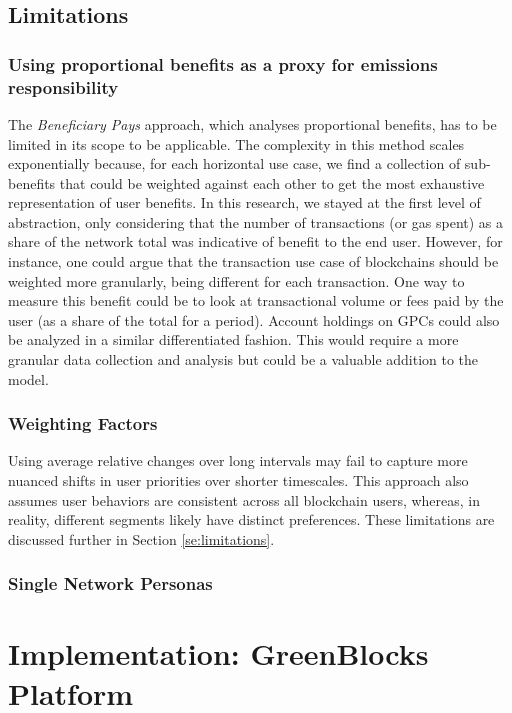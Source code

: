 \documentclass[11pt]{report}
\begin{document}
\section{Limitations}

\subsection*{Using proportional benefits as a proxy for emissions responsibility}
The \textit{Beneficiary Pays} approach, which analyses proportional benefits, has to be limited in its scope to be applicable. The complexity in this method scales exponentially because, for each horizontal use case, we find a collection of sub-benefits that could be weighted against each other to get the most exhaustive representation of user benefits. In this research, we stayed at the first level of abstraction, only considering that the number of transactions (or gas spent) as a share of the network total was indicative of benefit to the end user. However, for instance, one could argue that the transaction use case of blockchains should be weighted more granularly, being different for each transaction. One way to measure this benefit could be to look at transactional volume or fees paid by the user (as a share of the total for a period). Account holdings on GPCs could also be analyzed in a similar differentiated fashion. This would require a more granular data collection and analysis but could be a valuable addition to the model.


\subsection*{Weighting Factors}
Using average relative changes over long intervals may fail to capture more nuanced shifts in user priorities over shorter timescales. This approach also assumes user behaviors are consistent across all blockchain users, whereas, in reality, different segments likely have distinct preferences. These limitations are discussed further in Section \ref{se:limitations}.

\subsection*{Single Network Personas}





\chapter{Implementation: GreenBlocks Platform}
\end{document}
